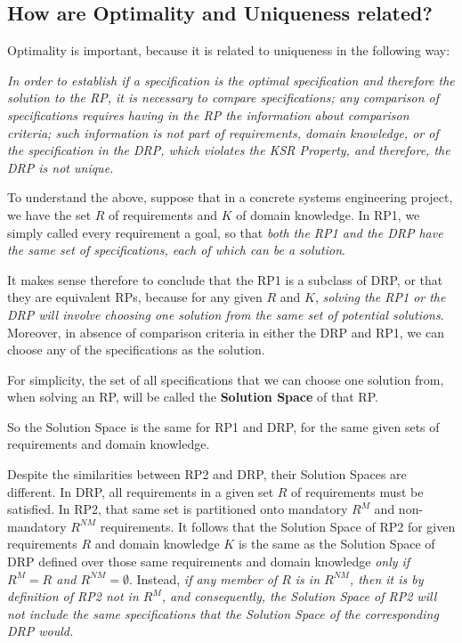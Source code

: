 \documentclass[graybox]{svmult}
\newcommand{\zi}[1]{\textit{#1}}
\newcommand{\xb}[1]{\textbf{#1}}
\newcommand{\xf}[1]{\textsf{#1}}
\newcommand{\RP}{RP}
\newcommand{\ZJRP}{DRP}
\newcommand{\SatisfactionCondition}{Satisfaction Condition}
\newcommand{\ConsistencyCondition}{Consistency Condition}
\newcommand{\SolutionSpace}{Solution Space}
\newcommand{\PrKSR}{\xf{KSR}}
\newcommand{\PrDR}{\xf{Decision Rule}}
\newcommand{\PropKSR}{\PrKSR{} Property}
\newcommand{\PropDR}{\PrDR{} Property}
\begin{document}


%
\subsection{How are Optimality and Uniqueness related?}\label{s:uniqueness:optimality-uniqueness}
Optimality is important, because it is related to uniqueness in the following way: 

\zi{In order to establish if a specification is the optimal specification and therefore the solution to the \RP, it is necessary to compare specifications; any comparison of specifications requires having in the \RP{} the information about comparison criteria; such information is not part of requirements, domain knowledge, or of the specification in the \ZJRP, which violates the \PropKSR, and therefore, the \ZJRP{} is not unique.}

To understand the above, suppose that in a concrete systems engineering project, we have the set $R$ of requirements and $K$ of domain knowledge. In RP1, we simply called every requirement a goal, so that \zi{both the RP1 and the \ZJRP{} have the same set of specifications, each of which can be a solution}. 

It makes sense therefore to conclude that the RP1 is a subclass of \ZJRP, or that they are equivalent \RP s, because for any given $R$ and $K$, \zi{solving the RP1 or the \ZJRP{} will involve choosing one solution from the same set of potential solutions}. Moreover, in absence of comparison criteria in either the \ZJRP{} and RP1, we can choose any of the specifications as the solution.

For simplicity, the set of all specifications that we can choose one solution from, when solving an \RP{}, will be called the \xb{\SolutionSpace} of that \RP.

So the \SolutionSpace{} is the same for RP1 and \ZJRP, for the same given sets of requirements and domain knowledge.

Despite the similarities between RP2 and \ZJRP, their \SolutionSpace s are different. In \ZJRP, all requirements in a given set $R$ of requirements must be satisfied. In RP2, that same set is partitioned onto mandatory $R^{M}$ and non-mandatory $R^{NM}$ requirements. It follows that the \SolutionSpace{} of RP2 for given requirements $R$ and domain knowledge $K$ is the same as the \SolutionSpace{} of \ZJRP{} defined over those same requirements and domain knowledge \zi{only if $R^{M} = R$ and $R^{NM} = \emptyset$}. Instead, \zi{if any member of $R$ is in $R^{NM}$, then it is by definition of RP2 not in $R^{M}$, and consequently, the \SolutionSpace{} of RP2 will not include the same specifications that the \SolutionSpace{} of the corresponding \ZJRP{} would.}
\end{document}
